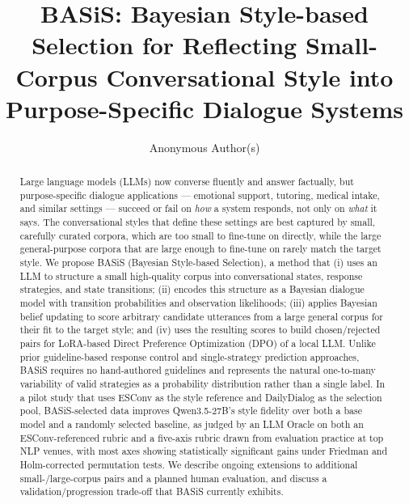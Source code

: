 \documentclass[manuscript,review,anonymous]{acmart}
\begin{document}
\title{BASiS: Bayesian Style-based Selection for Reflecting Small-Corpus Conversational Style into Purpose-Specific Dialogue Systems}

\author{Anonymous Author(s)}

\renewcommand{\shortauthors}{Anonymous Author(s)}

\begin{abstract}
Large language models (LLMs) now converse fluently and answer factually, but purpose-specific dialogue applications --- emotional support, tutoring, medical intake, and similar settings --- succeed or fail on \emph{how} a system responds, not only on \emph{what} it says. The conversational styles that define these settings are best captured by small, carefully curated corpora, which are too small to fine-tune on directly, while the large general-purpose corpora that are large enough to fine-tune on rarely match the target style. We propose BASiS (Bayesian Style-based Selection), a method that (i) uses an LLM to structure a small high-quality corpus into conversational states, response strategies, and state transitions; (ii) encodes this structure as a Bayesian dialogue model with transition probabilities and observation likelihoods; (iii) applies Bayesian belief updating to score arbitrary candidate utterances from a large general corpus for their fit to the target style; and (iv) uses the resulting scores to build chosen/rejected pairs for LoRA-based Direct Preference Optimization (DPO) of a local LLM. Unlike prior guideline-based response control and single-strategy prediction approaches, BASiS requires no hand-authored guidelines and represents the natural one-to-many variability of valid strategies as a probability distribution rather than a single label. In a pilot study that uses ESConv as the style reference and DailyDialog as the selection pool, BASiS-selected data improves Qwen3.5-27B's style fidelity over both a base model and a randomly selected baseline, as judged by an LLM Oracle on both an ESConv-referenced rubric and a five-axis rubric drawn from evaluation practice at top NLP venues, with most axes showing statistically significant gains under Friedman and Holm-corrected permutation tests. We describe ongoing extensions to additional small-/large-corpus pairs and a planned human evaluation, and discuss a validation/progression trade-off that BASiS currently exhibits.
\end{abstract}
\end{document}
